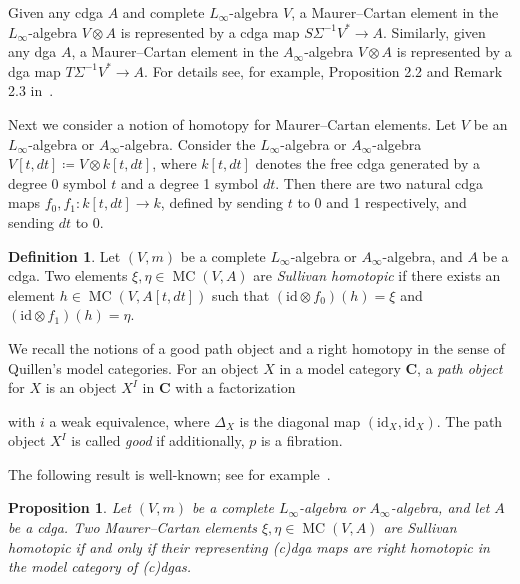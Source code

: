 \documentclass[a4paper,reqno]{amsart}
\theoremstyle{plain}
\newtheorem{prop}[thm]{Proposition}
\theoremstyle{definition}
\newtheorem{defn}[thm]{Definition}
\theoremstyle{remark}
\newcommand{\id}{\mathrm{id}}
\DeclareMathOperator{\MC}{MC}
\begin{document}
Given any cdga $A$ and complete $L_{\infty}$-algebra $V$, a Maurer--Cartan element in the $L_{\infty}$-algebra $V \otimes A$ is represented by a cdga map $S\Sigma^{-1}V^* \to A$. 
Similarly, given any dga $A$, a Maurer--Cartan element in the $A_{\infty}$-algebra $V \otimes A$ is represented by a dga map $T\Sigma^{-1}V^* \to A$.
For details see, for example, Proposition 2.2 and Remark 2.3 in~\cite{cl11}. 

Next we consider a notion of homotopy for Maurer--Cartan elements.
Let $V$ be an $L_{\infty}$-algebra or $A_{\infty}$-algebra.
Consider the $L_{\infty}$-algebra or $A_{\infty}$-algebra $V[t,dt] \coloneqq V \otimes k[t,dt]$, where $k[t,dt]$ denotes the free cdga generated by a degree 0 symbol $t$ and a degree 1 symbol $dt$. 
Then there are two natural cdga maps $f_0, f_1 \colon k[t,dt] \to k$, defined by sending $t$ to 0 and 1 respectively, and sending $dt$ to 0.

\begin{defn}
  Let $(V,m)$ be a complete $L_{\infty}$-algebra or $A_{\infty}$-algebra, and $A$ be a cdga.
  Two elements $\xi, \eta \in \MC(V,A)$ are \emph{Sullivan homotopic} if there exists an element $h \in \MC(V, A[t,dt])$ such that 
  $(\id \otimes f_0)(h) = \xi$ and 
  $(\id \otimes f_1)(h)  = \eta$.
\end{defn}

We recall the notions of a good path object and a right homotopy in the sense of Quillen's model categories. 
For an object $X$ in a model category $\mathbf{C}$, a \emph{path object} for $X$ is an object $X^I$ in $\mathbf{C}$ with a factorization
\begin{center}
\end{center}
with $i$ a weak equivalence, where $\Delta_X$ is the diagonal map $(\id_X,\id_X)$. 
The path object $X^I$ is called \emph{good} if additionally, $p$ is a fibration. 

The following result is well-known; see for example~\cite{laz13}.

\begin{prop}
  Let\/ $(V,m)$ be a complete $L_{\infty}$-algebra or $A_{\infty}$-algebra, and let $A$ be a cdga.
  Two Maurer--Cartan elements\/ $\xi, \eta \in \MC(V, A)$ are Sullivan homotopic if and only if their representing \textup(c\textup)dga maps are right homotopic in the model category of \textup(c\textup)dgas.
\end{prop}
\end{document}
